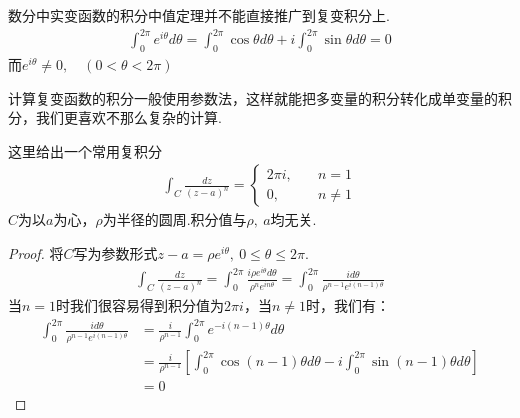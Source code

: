         \begin{remark}
            数分中实变函数的积分中值定理并不能直接推广到复变积分上.
            \begin{align*}
                \int_{0}^{2\pi}e^{i\theta}d\theta = \int_{0}^{2\pi}\cos{\theta}d\theta + i \int_{0}^{2\pi}\sin{\theta}d\theta = 0
            \end{align*}
            而$e^{i\theta} \neq 0, \quad (0 < \theta < 2\pi)$
        \end{remark}

        计算复变函数的积分一般使用参数法，这样就能把多变量的积分转化成单变量的积分，我们更喜欢不那么复杂的计算.

        \begin{example}
            \label{ex:important_integral}
            这里给出一个常用复积分
            \begin{align*}
                \int_{C}\frac{dz}{(z - a)^n} = 
                \left\{
                    \begin{aligned}
                        2\pi i ,& \quad n = 1 \\
                        0 ,& \quad n \neq 1
                    \end{aligned}
                \right.
            \end{align*}
            $C$为以$a$为心，$\rho$为半径的圆周.积分值与$\rho,\ a$均无关.
        \end{example}
        \begin{proof}
            \label{proof:important_integral}
            将$C$写为参数形式$z - a = \rho e^{i\theta},\ 0 \leq \theta \leq 2\pi$.
            \begin{align*}
                \int_{C}\frac{dz}{(z - a)^n} = \int_{0}^{2\pi}\frac{i \rho e^{i\theta}d\theta}{\rho^n e^{in\theta}} = \int_{0}^{2\pi}\frac{id\theta}{\rho^{n - 1}e^{i(n-1)\theta}}
            \end{align*}
            当$n = 1$时我们很容易得到积分值为$2\pi i$，当$n \neq 1$时，我们有：
            \begin{align*}
                \int_{0}^{2\pi}\frac{id\theta}{\rho^{n - 1}e^{i(n-1)\theta}}
                &= \frac{i}{\rho^{n - 1}}\int_{0}^{2\pi}e^{-i(n-1)\theta}d\theta\\
                &= \frac{i}{\rho^{n - 1}}\left[ \int_{0}^{2\pi}\cos{(n - 1)\theta}d\theta - i \int_{0}^{2\pi}\sin{(n - 1)\theta}d\theta \right]\\
                &= 0
            \end{align*}
        \end{proof}

